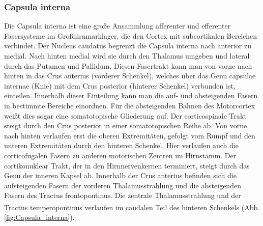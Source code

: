 \documentclass[12pt,a4paper,pdftex]{article}
\begin{document}
\subsubsection*{Capsula interna} 
Die Capsula interna ist eine große Ansammlung afferenter und efferenter Fasersysteme im Großhirnmarklager, die den Cortex mit subcortikalen Bereichen verbindet. Der Nucleus caudatus begrenzt die Capsula interna nach anterior zu medial. Nach hinten medial wird sie durch den Thalamus umgeben und lateral durch das Putamen und Pallidum. Diesen Fasertrakt kann man von vorne nach hinten in das Crus anterius (vorderer Schenkel), welches über das Genu capsulae internae (Knie) mit dem Crus posterior (hinterer Schenkel) verbunden ist, einteilen. Innerhalb dieser Einteilung kann man die auf- und absteigenden Fasern in bestimmte Bereiche einordnen. Für die absteigenden Bahnen des Motorcortex weißt dies sogar eine somatotopische Gliederung auf. Der corticospinale Trakt steigt durch den Crus posterior in einer somatotopischen Reihe ab. Von vorne nach hinten verlaufen erst die oberen Extremitäten, gefolgt vom Rumpf und den unteren Extremitäten durch den hinteren Schenkel. Hier verlaufen auch die corticofugalen Fasern zu anderen motorischen Zentren im Hirnstamm. Der cortikonuklear Trakt, der in den Hirnnervenkernen terminiert, steigt durch das Genu der inneren Kapsel ab. Innerhalb der Crus anterius befinden sich die aufsteigenden Fasern der vorderen Thalamusstrahlung und die absteigenden Fasern des Tractus frontopontinus. Die zentrale Thalamusstrahlung und der Tractus temperopontinus verlaufen im caudalen Teil des hinteren Schenkels \textsuperscript{\cite[9]{trepel2011neuroanatomie}} (Abb. \ref{fig:Capsula_interna}).
\end{document}
